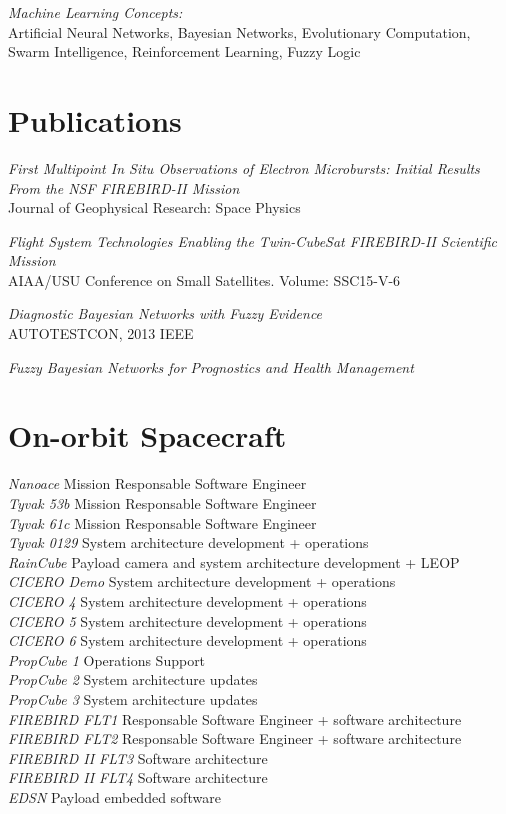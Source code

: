 \documentclass[line,margin]{res}
\begin{document}
\begin{resume}
                {\sl Machine Learning Concepts:}\\Artificial Neural Networks, Bayesian Networks, Evolutionary Computation, Swarm Intelligence, Reinforcement Learning, Fuzzy Logic
			
\section{Publications} 
{\sl First Multipoint In Situ Observations of Electron Microbursts: Initial Results From the NSF FIREBIRD-II Mission}\\
Journal of Geophysical Research: Space Physics

{\sl Flight System Technologies Enabling the Twin-CubeSat FIREBIRD-II Scientific Mission}\\
AIAA/USU Conference on Small Satellites. Volume: SSC15-V-6 

{\sl Diagnostic Bayesian Networks with Fuzzy Evidence}\\
AUTOTESTCON, 2013 IEEE

{\sl Fuzzy Bayesian Networks for Prognostics and Health Management}\\	

\section{On-orbit Spacecraft}
{\sl Nanoace} \hfill Mission Responsable Software Engineer\\
{\sl Tyvak 53b} \hfill Mission Responsable Software Engineer\\
{\sl Tyvak 61c} \hfill Mission Responsable Software Engineer\\
{\sl Tyvak 0129} \hfill System architecture development + operations\\
{\sl RainCube} \hfill Payload camera and system architecture development + LEOP\\
{\sl CICERO Demo} \hfill System architecture development + operations\\
{\sl CICERO 4} \hfill System architecture development + operations\\
{\sl CICERO 5} \hfill System architecture development + operations\\
{\sl CICERO 6} \hfill System architecture development + operations\\
{\sl PropCube 1} \hfill Operations Support\\
{\sl PropCube 2} \hfill System architecture updates\\
{\sl PropCube 3} \hfill System architecture updates\\
{\sl FIREBIRD FLT1} \hfill Responsable Software Engineer + software architecture\\
{\sl FIREBIRD FLT2} \hfill Responsable Software Engineer + software architecture\\
{\sl FIREBIRD II FLT3} \hfill Software architecture\\
{\sl FIREBIRD II FLT4} \hfill Software architecture\\
{\sl EDSN} \hfill Payload embedded software\\
			
\end{resume}
\end{document}
